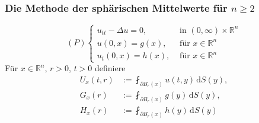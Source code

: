 \subsubsection{Die Methode der sphärischen Mittelwerte für $n \geq 2$} 
\label{ssub:die_methode_der_spharischen_mittelwerte_fur_n_geq_2}
\[
	(P) \begin{cases}
		u_{tt}- \Delta u = 0, &\text{ in }(0,\infty) \times \mathbb{R}^n\\
		u(0,x) = g(x), &\text{ für } x \in \mathbb{R}^n \\
		u_t(0,x)=h(x), &\text{ für } x \in \mathbb{R}^n
		\end{cases}
\]
Für $x \in \mathbb{R}^n$, $r>0$, $t>0$ definiere
\begin{align*}
	U_x(t,r) &:= \fint_{\partial B_r(x)}^{} u(t,y) \,\mathrm{d}S(y), \\
	G_x(r) &:= \fint_{\partial B_r(x)}^{} g(y) \,\mathrm{d}S(y), \\
	H_x(r) &:= \fint_{\partial B_r(x)}^{} h(y) \,\mathrm{d}S(y)
\end{align*}

